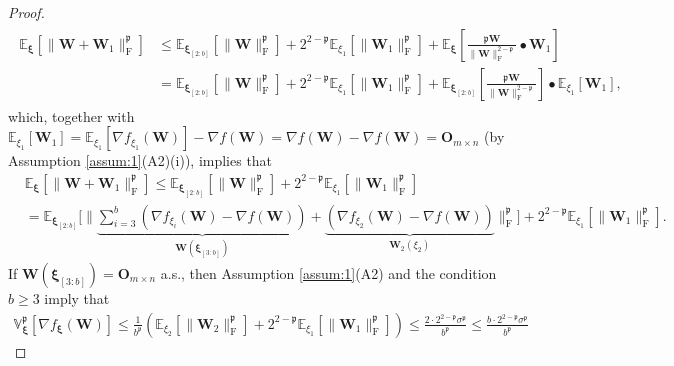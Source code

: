 \documentclass[twoside,11pt]{article}
\begin{document}
\begin{proof}
\begin{align}\label{expan_1}
\begin{split}
\mathbb{E}_{\bm{\xi}} [\|\bm{W} + \bm{W}_1 \|_{\mathrm{F}}^{\mathfrak{p}}]
&\leq
\mathbb{E}_{\bm{\xi}_{[2:b]}} [ \|\bm{W}\|_{\mathrm{F}}^{\mathfrak{p}}]
+
2^{2 - \mathfrak{p}} \mathbb{E}_{\xi_1} [\|\bm{W}_1\|_{\mathrm{F}}^{\mathfrak{p}}]
+
\mathbb{E}_{\bm{\xi}} \left[ \frac{\mathfrak{p} \bm{W}}{\|\bm{W}\|_{\mathrm{F}}^{2 - \mathfrak{p}}}
\bullet \bm{W}_1 \right]\\
&=
\mathbb{E}_{\bm{\xi}_{[2:b]}} [ \|\bm{W}\|_{\mathrm{F}}^{\mathfrak{p}}]
+
2^{2 - \mathfrak{p}} \mathbb{E}_{\xi_1} [\|\bm{W}_1\|_{\mathrm{F}}^{\mathfrak{p}}]
+
\mathbb{E}_{\bm{\xi}_{[2:b]}} \left[ \frac{\mathfrak{p} \bm{W}}{\|\bm{W}\|_{\mathrm{F}}^{2 - \mathfrak{p}}}\right]
\bullet \mathbb{E}_{\xi_1} [\bm{W}_1],
\end{split} 
\end{align}
which, together with $\mathbb{E}_{\xi_1}[\bm{W}_1] = \mathbb{E}_{\xi_1}[\nabla f_{\xi_{1}}(\bm{W})] - \nabla f (\bm{W}) = \nabla f (\bm{W}) - \nabla f (\bm{W}) = \bm{O}_{m \times n}$ (by Assumption \ref{assum:1}(A2)(i)), implies that
\begin{align}\label{repeat_1}
&\mathbb{E}_{\bm{\xi}} [\|\bm{W} + \bm{W}_1 \|_{\mathrm{F}}^{\mathfrak{p}}]
\leq
\mathbb{E}_{\bm{\xi}_{[2:b]}} [ \|\bm{W}\|_{\mathrm{F}}^{\mathfrak{p}}]
+
2^{2 - \mathfrak{p}} \mathbb{E}_{\xi_1} [\|\bm{W}_1\|_{\mathrm{F}}^{\mathfrak{p}}]\\
&=
\mathbb{E}_{\bm{\xi}_{[2:b]}} \Bigg[ \Bigg\|
\underbrace{\sum_{i=3}^b \left( \nabla f_{\xi_{i}}(\bm{W}) - \nabla f (\bm{W}) \right)}_{\bm{W}(\bm{\xi}_{[3:b]})}
+
\underbrace{\left( \nabla f_{\xi_{2}}(\bm{W}) - \nabla f (\bm{W}) \right)}_{\bm{W}_2 (\xi_2)}
\Bigg\|_{\mathrm{F}}^{\mathfrak{p}} \Bigg]
+
2^{2 - \mathfrak{p}} \mathbb{E}_{\xi_1} [\|\bm{W}_1\|_{\mathrm{F}}^{\mathfrak{p}}]. \nonumber 
\end{align}
If $\bm{W}(\bm{\xi}_{[3:b]}) = \bm{O}_{m \times n}$ a.s., then Assumption \ref{assum:1}(A2) and the condition $b \geq 3$ imply that 
\begin{align*}
\mathbb{V}_{\bm{\xi}}^{\mathfrak{p}}[\nabla f_{\bm{\xi}} (\bm{W})]
\leq 
\frac{1}{b^{\mathfrak{p}}} 
\left( 
\mathbb{E}_{\xi_2}[\| \bm{W}_2 \|_{\mathrm{F}}^{\mathfrak{p}}]
+
2^{2 - \mathfrak{p}} \mathbb{E}_{\xi_1} [\|\bm{W}_1\|_{\mathrm{F}}^{\mathfrak{p}}]
\right)
\leq 
\frac{2 \cdot 2^{2 - \mathfrak{p}} \sigma^{\mathfrak{p}}}{b^{\mathfrak{p}}}
\leq 
\frac{b \cdot 2^{2 - \mathfrak{p}} \sigma^{\mathfrak{p}}}{b^{\mathfrak{p}}}

\end{align*}
\end{proof}
\end{document}

